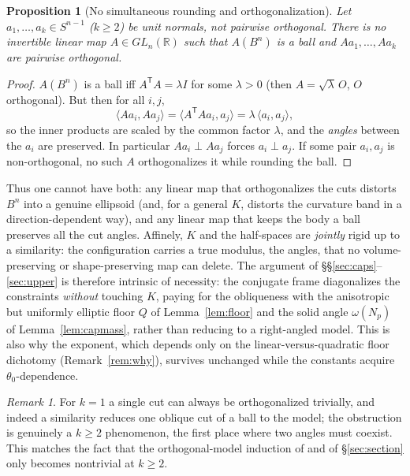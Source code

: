 \documentclass[11pt]{article}
\newtheorem{proposition}[theorem]{Proposition}
\theoremstyle{definition}
\theoremstyle{remark}
\newtheorem{remark}[theorem]{Remark}
\newcommand{\R}{\mathbb{R}}
\begin{document}
\begin{proposition}[No simultaneous rounding and orthogonalization]\label{prop:john}
Let $a_1,\dots,a_k\in S^{n-1}$ ($k\ge2$) be unit normals, not pairwise
orthogonal.  There is no invertible linear map $A\in GL_n(\R)$ such that
$A(B^n)$ is a ball and $Aa_1,\dots,Aa_k$ are pairwise orthogonal.
\end{proposition}

\begin{proof}
$A(B^n)$ is a ball iff $A^{\mathsf T}A=\lambda I$ for some $\lambda>0$ (then
$A=\sqrt\lambda\,O$, $O$ orthogonal).  But then for all $i,j$,
\[
\langle Aa_i,Aa_j\rangle=\langle A^{\mathsf T}Aa_i,a_j\rangle
=\lambda\,\langle a_i,a_j\rangle,
\]
so the inner products are scaled by the common factor $\lambda$, and the
\emph{angles} between the $a_i$ are preserved.  In particular $Aa_i\perp Aa_j$
forces $a_i\perp a_j$.  If some pair $a_i,a_j$ is non-orthogonal, no such $A$
orthogonalizes it while rounding the ball.
\end{proof}

Thus one cannot have both: any linear map that orthogonalizes the cuts
distorts $B^n$ into a genuine ellipsoid (and, for a general $K$, distorts the
curvature band in a direction-dependent way), and any linear map that keeps the
body a ball preserves all the cut angles.  Affinely, $K$ and the half-spaces are
\emph{jointly} rigid up to a similarity: the configuration carries a true
modulus, the angles, that no volume-preserving or shape-preserving map can
delete.  The argument of \S\S\ref{sec:caps}--\ref{sec:upper} is therefore
intrinsic of necessity: the conjugate frame diagonalizes the constraints
\emph{without} touching $K$, paying for the obliqueness with the anisotropic but
uniformly elliptic floor $Q$ of Lemma~\ref{lem:floor} and the solid angle
$\omega(N_p)$ of Lemma~\ref{lem:capmass}, rather than reducing to a right-angled
model.  This is also why the exponent, which depends only on the
linear-versus-quadratic floor dichotomy (Remark~\ref{rem:why}), survives
unchanged while the constants acquire $\theta_0$-dependence.

\begin{remark}
For $k=1$ a single cut can always be orthogonalized trivially, and indeed a
similarity reduces one oblique cut of a ball to the model; the obstruction is
genuinely a $k\ge2$ phenomenon, the first place where two angles must coexist.
This matches the fact that the orthogonal-model induction of
\cite{companion11} and of \S\ref{sec:section} only becomes nontrivial at
$k\ge2$.
\end{remark}
\end{document}

